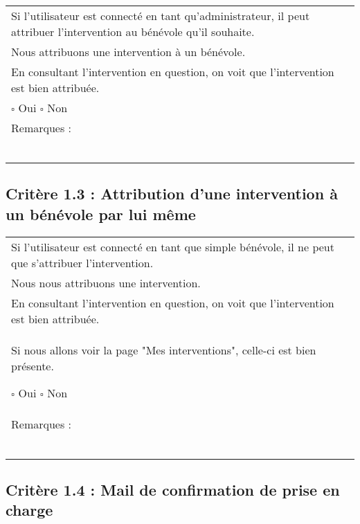 		\begin{center}
    	 		\begin{tabular}[h]{|p{}|}
			\hline
				Si l’utilisateur est connecté en tant qu’administrateur, il peut attribuer l’intervention au
bénévole qu’il souhaite.\\
Nous attribuons une intervention à un bénévole.\\
En consultant l’intervention en question, on voit que l’intervention est bien attribuée.\\
				
				$\square$ Oui \hfill \hfill $\square$ Non \\\hline Remarques : \\ ~\\
			 \\\hline
     		\end{tabular}
  		\end{center}	

	\subsection*{Critère 1.3 : Attribution d’une intervention à un bénévole par lui même}
	
		\begin{center}
    	 		\begin{tabular}[h]{|p{}|}
			\hline
				Si l’utilisateur est connecté en tant que simple bénévole, il ne peut que s’attribuer l’intervention.\\
Nous nous attribuons une intervention.\\
En consultant l’intervention en question, on voit que l’intervention est bien attribuée.\\
Si nous allons voir la page "Mes interventions", celle-ci est bien présente.
				
				$\square$ Oui \hfill \hfill $\square$ Non \\\hline Remarques : \\ ~\\
			 \\\hline
     		\end{tabular}
  		\end{center}	

	\subsection*{Critère 1.4 : Mail de confirmation de prise en charge}
	
